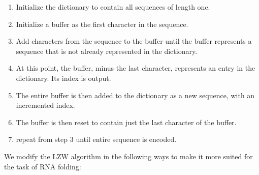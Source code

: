 \documentclass[sigconf]{acmart}
\begin{document}
\begin{enumerate}
\item Initialize the dictionary to contain all sequences of length one. 
\item Initialize a buffer as the first character in the sequence.
\item Add characters from the sequence to the buffer until the buffer represents a sequence that is not already represented in the dictionary. 
\item At this point, the buffer, minus the last character, represents an entry in the dictionary. Its index is output.
\item The entire buffer is then added to the dictionary as a new sequence, with an incremented index.
\item The buffer is then reset to contain just the last character of the buffer.
\item repeat from step 3 until entire sequence is encoded.
\end{enumerate}

We modify the LZW algorithm in the following ways to make it more suited for the task of RNA folding:
\end{document}
